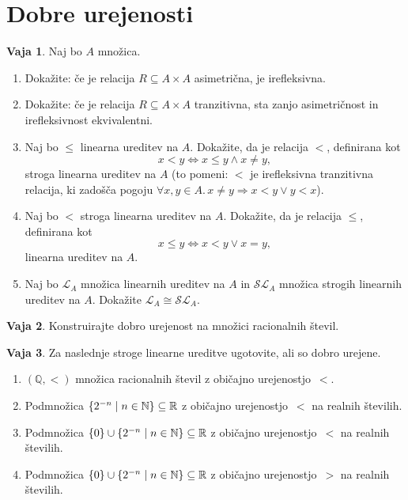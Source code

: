 \documentclass{article}
\newcommand{\all}[1]{\forall #1 .\,}
\newcommand{\lthen}{\Rightarrow}
\newcommand{\NN}{\mathbb{N}}
\newcommand{\QQ}{\mathbb{Q}}
\newcommand{\RR}{\mathbb{R}}
\theoremstyle{definition}
\newtheorem{vaja}{Vaja}
\begin{document}
\section{Dobre urejenosti}

\begin{vaja}
  Naj bo $A$ množica.
  \begin{enumerate}
    \item
      Dokažite: če je relacija $R \subseteq A \times A$ asimetrična, je irefleksivna.
    \item
      Dokažite: če je relacija $R \subseteq A \times A$ tranzitivna, sta zanjo asimetričnost in irefleksivnost ekvivalentni.
    \item
      Naj bo $\leq$ linearna ureditev na $A$. Dokažite, da je relacija $<$, definirana kot
      \[x < y \iff x \leq y \land x \neq y,\]
      stroga linearna ureditev na $A$ (to pomeni: $<$ je irefleksivna tranzitivna relacija, ki zadošča pogoju $\all{x, y \in A}{x \neq y \lthen x < y \lor y < x}$).
    \item
      Naj bo $<$ stroga linearna ureditev na $A$. Dokažite, da je relacija $\leq$, definirana kot
      \[x \leq y \iff x < y \lor x = y,\]
      linearna ureditev na $A$.
    \item
      Naj bo $\mathcal{L}_A$ množica linearnih ureditev na $A$ in $\mathcal{SL}_A$ množica strogih linearnih ureditev na $A$. Dokažite $\mathcal{L}_A \cong \mathcal{SL}_A$.
  \end{enumerate}
\end{vaja}

\begin{vaja}
  Konstruirajte dobro urejenost na množici racionalnih števil.
\end{vaja}

\begin{vaja}
  Za naslednje stroge linearne ureditve ugotovite, ali so dobro urejene.
  \begin{enumerate}
    \item
      $(\QQ, <)$ množica racionalnih števil z običajno urejenostjo~$<$.
    \item
      Podmnožica $\set{2^{-n}}{n \in \NN} \subseteq \RR$ z običajno urejenostjo~$<$ na realnih številih.
    \item
      Podmnožica $\set{0} \cup \set{2^{-n}}{n \in \NN} \subseteq \RR$ z običajno urejenostjo~$<$ na realnih številih.
    \item
      Podmnožica $\set{0} \cup \set{2^{-n}}{n \in \NN} \subseteq \RR$ z običajno urejenostjo~$>$ na realnih številih.
  \end{enumerate}
\end{vaja}
\end{document}
